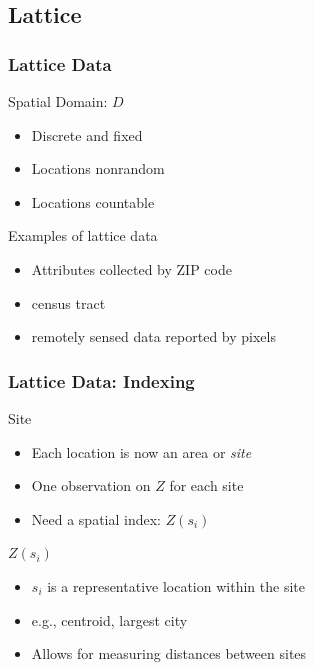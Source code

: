 \documentclass[nototal,handout]{beamer}
\begin{document}
\subsection{Lattice}
\begin{frame}[<+->]
  \frametitle{Lattice Data}
  \begin{block}{Spatial Domain: $D$ }
    \begin{itemize}
      \item Discrete and fixed
      \item Locations nonrandom
      \item Locations countable
    \end{itemize}
   \end{block}
\begin{block}{Examples of lattice data}
    \begin{itemize}
      \item Attributes collected by ZIP code
      \item census tract
      \item remotely sensed data reported by pixels
    \end{itemize}
   \end{block}
 \end{frame}
\begin{frame}[<+->]
  \frametitle{Lattice Data: Indexing}
  \begin{block}{Site }
    \begin{itemize}
      \item Each location is now an area or \emph{site}
      \item One observation on $Z$ for each site
      \item Need a spatial index: $Z(s_i)$
    \end{itemize}
   \end{block}
\begin{block}{$Z(s_i)$}
    \begin{itemize}
      \item $s_i$ is a representative location within the site
      \item e.g., centroid, largest city
      \item Allows for measuring distances between sites
    \end{itemize}
   \end{block}
 \end{frame}
\end{document}
